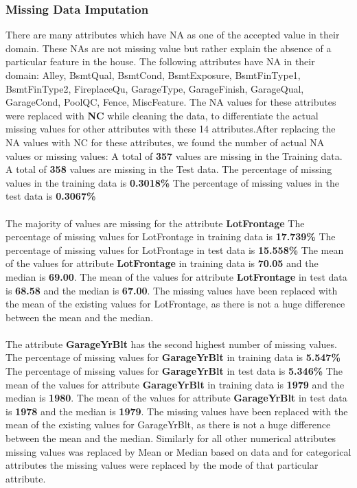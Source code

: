 \documentclass[fleqn,10pt]{SelfArx} %
\begin{document}
\subsubsection{Missing Data Imputation}
There are many attributes which have NA as one of the accepted value in their domain. These NA\textquotesingle s are not missing value but rather explain the absence of a particular feature in the house. The following attributes have NA in their domain:
Alley, BsmtQual, BsmtCond, BsmtExposure, BsmtFinType1, BsmtFinType2, FireplaceQu, GarageType, GarageFinish, GarageQual, GarageCond, PoolQC, Fence, MiscFeature.
The NA values for these attributes were replaced with \textbf{NC} while cleaning the data, to differentiate the actual missing values for other attributes with these 14 attributes.After replacing the NA values with NC for these attributes, we found the number of actual NA values or missing values:
A total of \textbf{357} values are missing in the Training data.
A total of \textbf{358} values are missing in the Test data.
The percentage of missing values in the training data is \textbf{0.3018\%}
The percentage of missing values in the test data is \textbf{0.3067\%}
\\ \\The majority of values are missing for the attribute \textbf{LotFrontage}
The percentage of missing values for LotFrontage in training data is \textbf{17.739\%}
The percentage of missing values for LotFrontage in test data is \textbf{15.558\%}
The mean of the values for attribute \textbf{LotFrontage} in training data is \textbf{70.05} and the median is \textbf{69.00}.
The mean of the values for attribute \textbf{LotFrontage} in test data is \textbf{68.58} and the median is \textbf{67.00}.
The missing values have been replaced with the mean of the existing values for LotFrontage, as there is not a huge difference between the mean and the median.
\\ \\The attribute \textbf{GarageYrBlt} has the second highest number of missing values.
The percentage of missing values for \textbf{GarageYrBlt} in training data is \textbf{5.547\%}
The percentage of missing values for \textbf{GarageYrBlt} in test data is \textbf{5.346\%}
The mean of the values for attribute \textbf{GarageYrBlt} in training data is \textbf{1979} and the median is \textbf{1980}.
The mean of the values for attribute \textbf{GarageYrBlt} in test data is \textbf{1978 }and the median is \textbf{1979}.
The missing values have been replaced with the mean of the existing values for GarageYrBlt, as there is not a huge difference between the mean and the median.
Similarly for all other numerical attributes missing values was replaced by Mean or Median based on data and for categorical attributes the missing values were replaced by the mode of that particular attribute.
%
\end{document}

